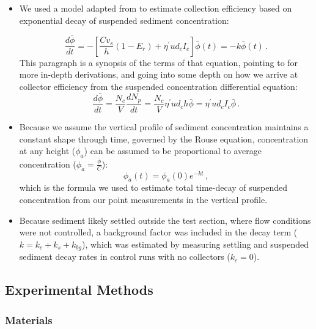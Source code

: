 \documentclass{article}
\begin{document}
\begin{itemize}
    \item We used a model adapted from \cite{Fauria_2015} to estimate collection efficiency based on exponential decay of suspended sediment concentration:

\begin{equation}
    \frac{d\bar{\phi}}{dt} = -\left[\frac{Cv_s}{h}(1-E_r) + \eta^{\prime}ud_cI_c\right]\bar{\phi}(t) = -k\bar{\phi}(t)\,.
    \label{eq:model}    
\end{equation}
    This paragraph is a synopsis of the terms of that equation, pointing to \cite{Fauria_2015} for more in-depth derivations, and going into some depth on how we arrive at collector efficiency from the suspended concentration differential equation:
    \begin{equation}
\frac{d\bar{\phi}}{dt} = \frac{N_c}{V}\frac{dN_p}{dt} = \frac{N_c}{V}\eta^{\prime}ud_ch\bar{\phi} = \eta^{\prime}ud_cI_c\bar{\phi}\,.
\label{eq:collection}
\end{equation}
\item Because we assume the vertical profile of sediment concentration maintains a constant shape through time, governed by the Rouse equation, concentration at any height ($\phi_a$) can be assumed to be proportional to average concentration ($\phi_a=\frac{\bar{\phi}}{C}$):
\begin{equation}
    \phi_a(t) = \phi_a(0)e^{-kt}\,,
    \label{eq:specconc}
\end{equation}
which is the formula we used to estimate total time-decay of suspended concentration from our point measurements in the vertical profile.
\item Because sediment likely settled outside the test section, where flow conditions were not controlled, a background factor was included in the decay term ($k = k_c + k_s + k_{bg}$), which was estimated by measuring settling and suspended sediment decay rates in control runs with no collectors ($k_c = 0$).
\end{itemize}

\subsection{Experimental Methods}

\subsubsection{Materials}
\end{document}
